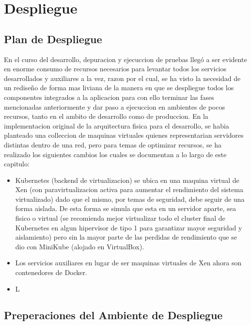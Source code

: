 
\chapter{Despliegue}
\label{capitulo6}

\section{Plan de Despliegue}
En el curso del desarrollo, depuracion y ejecuccion de pruebas llegó a ser evidente en enorme consumo de recursos necesarios para levantar todos los servicios desarrollados y auxiliares a la vez, razon por el cual, se ha visto la necesidad de un rediseño de forma mas liviana de la manera en que se despliegue todos los componentes integrados a la aplicacion para con ello terminar las fases mencionadas anteriormente y dar paso a ejecuccion en ambientes de pocos recursos, tanto en el ambito de desarrollo como de produccion. En la implementacion original de la arquitectura fisica para el desarrollo, se habia planteado una colleccion de maquinas virtuales quienes representarian servidores distintas dentro de una red, pero para temas de optimizar recursos, se ha realizado los siguientes cambios los cuales se documentan a lo largo de este capitulo:
\begin{itemize}
	\item Kubernetes (backend de virtualizacion) se ubica en una maquina virtual de Xen (con paravirtualizacion activa para aumentar el rendimiento del sistema virtualizado) dado que el mismo, por temas de seguridad, debe seguir de una forma aislada. De esta forma se simula que esta en un servidor aparte, sea fisico o virtual (se recomienda mejor virtualizar todo el cluster final de Kubernetes en algun hipervisor de tipo 1 para garantizar mayor seguridad y aislamiento) pero sin la mayor parte de las perdidas de rendimiento que se dio con MiniKube (alojado en VirtualBox).
    \item Los servicios auxiliares en lugar de ser maquinas virtuales de Xen ahora son contenedores de Docker.
    \item L
\end{itemize}

\section{Preperaciones del Ambiente de Despliegue}

